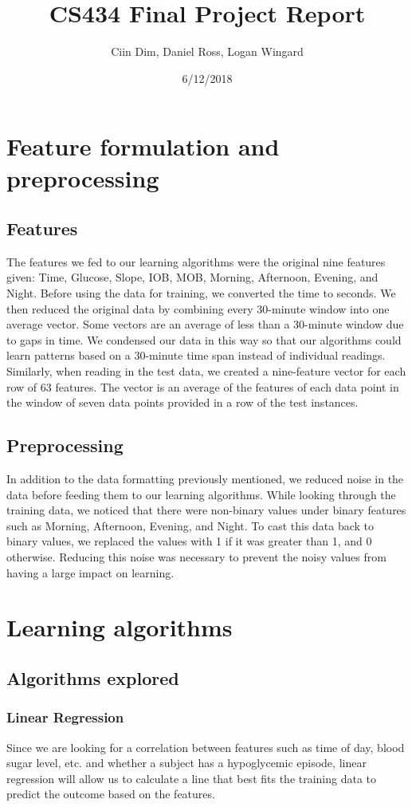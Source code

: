 \documentclass[11pt,a4paper]{article}
\title{CS434 Final Project Report}
\author{Ciin Dim, Daniel Ross, Logan Wingard}
\date{6/12/2018}
\begin{document}
\maketitle
\section{Feature formulation and preprocessing}
\subsection{Features}
The features we fed to our learning algorithms were the original nine features given: Time, Glucose, Slope, IOB, MOB, Morning, Afternoon, Evening, and Night. Before using the data for training, we converted the time to seconds. We then reduced the original data by combining every 30-minute window into one average vector. Some vectors are an average of less than a 30-minute window due to gaps in time. We condensed our data in this way so that our algorithms could learn patterns based on a 30-minute time span instead of individual readings. Similarly, when reading in the test data, we created a nine-feature vector for each row of 63 features. The vector is an average of the features of each data point in the window of seven data points provided in a row of the test instances.

\subsection{Preprocessing}
In addition to the data formatting previously mentioned, we reduced noise in the data before feeding them to our learning algorithms. While looking through the training data, we noticed that there were non-binary values under binary features such as Morning, Afternoon, Evening, and Night. To cast this data back to binary values, we replaced the values with 1 if it was greater than 1, and 0 otherwise. Reducing this noise was necessary to prevent the noisy values from having a large impact on learning.

\section{Learning algorithms}
\subsection{Algorithms explored}
\subsubsection{Linear Regression}
Since we are looking for a correlation between features such as time of day, blood sugar level, etc. and whether a subject has a hypoglycemic episode, linear regression will allow us to calculate a line that best fits the training data to predict the outcome based on the features.
\end{document}
